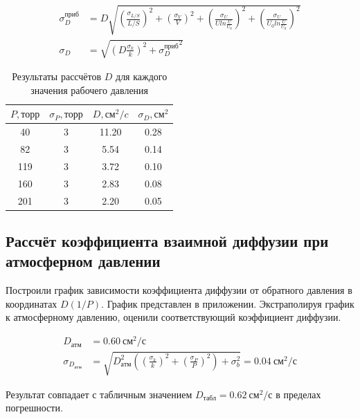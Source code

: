 \documentclass[a4paper, 12pt]{article}
\begin{document}
        \begin{align*}
            \sigma_D^{приб} &= D \sqrt{\left( \frac{\sigma_{L/S}}{L/S} \right)^2 + \left( \frac{\sigma_V}{V} \right)^2 + \left( \frac{\sigma_U}{U ln \frac{U}{U_0}} \right)^2 + \left( \frac{\sigma_U}{U_0 ln \frac{U}{U_0}} \right)^2}\\
            \sigma_D &= \sqrt{\left( D \frac{\sigma_k}{k} \right)^2 + {\sigma_D^{приб}}^2}
        \end{align*}

        \begin{table}[!ht]
            \centering
            \begin{tabular}{|c|c|c|c|}
            \hline
                $P, торр$ & $\sigma_P, торр$ & $D, см^2/c$ & $\sigma_D, см^2$ \\ \hline
                40 & 3 & 11.20 & 0.28 \\ \hline
                82 & 3 & 5.54 & 0.14 \\ \hline
                119 & 3 & 3.72 & 0.10 \\ \hline
                160 & 3 & 2.83 & 0.08 \\ \hline
                201 & 3 & 2.20 & 0.05 \\ \hline
            \end{tabular}

            \caption{Результаты рассчётов $D$ для каждого значения рабочего давления}
            \label{coeffs}
        \end{table}

    \subsection{Рассчёт коэффициента взаимной диффузии при атмосферном давлении}

        Построили график зависимости коэффициента диффузии от обратного давления в координатах $D(1/P)$. График представлен в приложении. Экстраполируя график к атмосферному давлению, оценили соответствующий коэффициент диффузии.

        \begin{align*}
            D_{атм} &= 0.60~см^2/с\\
            \sigma_{D_{атм}} &=  \sqrt{ D_{атм}^2 \left( \left( \frac{\sigma_k}{k} \right)^2 + \left( \frac{\sigma_P}{P} \right)^2 \right) + \sigma_b^2} = 0.04~см^2/с
        \end{align*}

        Результат совпадает с табличным значением $D_{табл} = 0.62~см^2/с$ в пределах погрешности.
\end{document}
